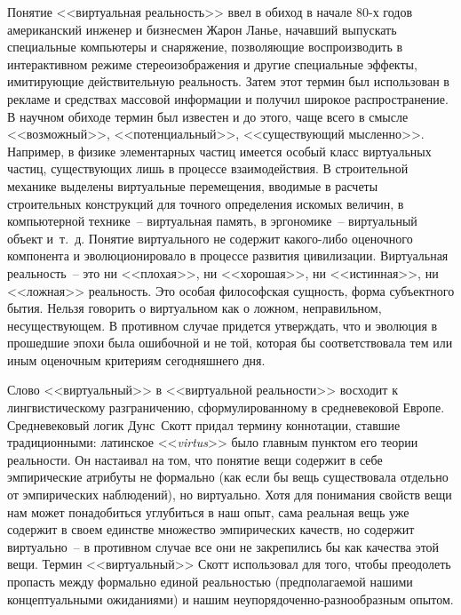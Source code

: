   Понятие <<виртуальная реальность>> ввел в обиход в начале 80-х годов
  американский инженер и бизнесмен Жарон Ланье, начавший выпускать специальные
  компьютеры и снаряжение, позволяющие воспроизводить в интерактивном режиме
  стереоизображения и другие специальные эффекты, имитирующие действительную
  реальность. Затем этот термин был использован в рекламе и средствах массовой
  информации и получил широкое распространение. В научном обиходе термин был
  известен и до этого, чаще всего в смысле <<возможный>>, <<потенциальный>>,
  <<существующий мысленно>>. Например, в физике элементарных частиц имеется
  особый класс виртуальных частиц, существующих лишь в процессе взаимодействия.
  В строительной механике выделены виртуальные перемещения, вводимые в расчеты
  строительных конструкций для точного определения искомых величин, в
  компьютерной технике~-- виртуальная память, в эргономике~-- виртуальный
  объект и~т.~д. Понятие виртуального не содержит какого-либо оценочного
  компонента и эволюционировало в процессе развития цивилизации. Виртуальная
  реальность~-- это ни <<плохая>>, ни <<хорошая>>, ни <<истинная>>, ни
  <<ложная>> реальность. Это особая философская сущность, форма субъектного
  бытия. Нельзя говорить о виртуальном как о ложном, неправильном,
  несуществующем. В противном случае придется утверждать, что и эволюция в
  прошедшие эпохи была ошибочной и не той, которая бы соответствовала тем или
  иным оценочным критериям сегодняшнего дня.~\cite{Cohrsuntsev}
  
  Слово <<виртуальный>> в <<виртуальной реальности>> восходит к
  лингвистическому разграничению, сформулированному в средневековой Европе.
  Средневековый логик Дунс~Скотт придал термину коннотации, ставшие
  традиционными: латинское <<\emph{virtus}>> было главным пунктом его теории
  реальности. Он настаивал на том, что понятие вещи содержит в себе
  эмпирические атрибуты не формально (как если бы вещь существовала отдельно от
  эмпирических наблюдений), но виртуально. Хотя для понимания свойств вещи нам
  может понадобиться углубиться в наш опыт, сама реальная вещь уже содержит в
  своем единстве множество эмпирических качеств, но содержит виртуально~-- в
  противном случае все они не закрепились бы как качества этой вещи. Термин
  <<виртуальный>> Скотт использовал для того, чтобы преодолеть пропасть между
  формально единой реальностью (предполагаемой нашими концептуальными
  ожиданиями) и нашим неупорядоченно-разнообразным опытом.
  

